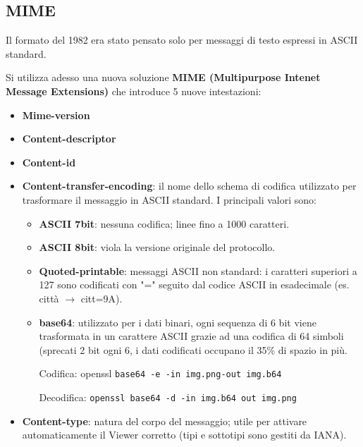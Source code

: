    \subsection{MIME}
        Il formato del 1982 era stato pensato solo per messaggi di testo espressi in ASCII standard.
    
        Si utilizza adesso una nuova soluzione \textbf{MIME (Multipurpose Intenet Message Extensions)} che introduce 5 nuove intestazioni:
        \begin{itemize}
            \item \textbf{Mime-version}
            \item \textbf{Content-descriptor}
            \item \textbf{Content-id}
            \item \textbf{Content-transfer-encoding}: il nome dello schema di codifica utilizzato per trasformare il messaggio in ASCII standard. I principali valori sono:
            \begin{itemize}
                \item \textbf{ASCII 7bit}: nessuna codifica; linee fino a 1000 caratteri.
                \item \textbf{ASCII 8bit}: viola la versione originale del protocollo.
                \item \textbf{Quoted-printable}: messaggi ASCII non standard: i caratteri superiori a 127 sono codificati con "=" seguito dal codice ASCII in esadecimale (es. città $\rightarrow$ citt=9A).
                \item \textbf{base64}: utilizzato per i dati binari, ogni sequenza di 6 bit viene trasformata in un carattere ASCII grazie ad una codifica di 64 simboli (sprecati 2 bit ogni 6, i dati codificati occupano il 35\% di spazio in più.
                
                Codifica: openssl \verb:base64 -e -in img.png-out img.b64:
                
                Decodifica: \verb:openssl base64 -d -in img.b64 out img.png:
            \end{itemize}
            \item \textbf{Content-type}: natura del corpo del messaggio; utile per attivare automaticamente il Viewer corretto (tipi e sottotipi sono gestiti da IANA).
        \end{itemize}

